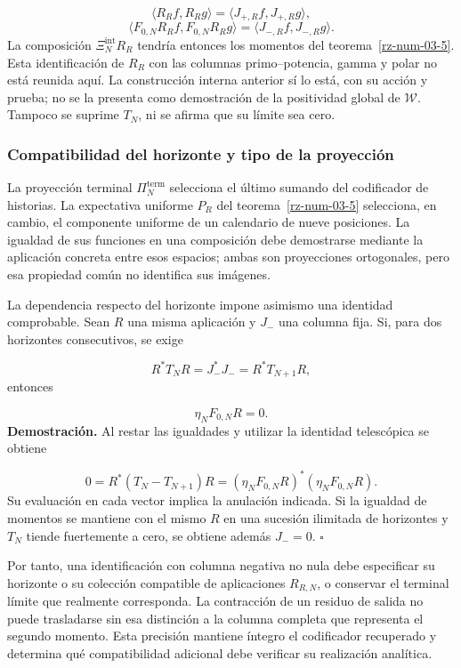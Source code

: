 \[
\langle R_Rf,R_Rg\rangle
=\langle J_{+,R}f,J_{+,R}g\rangle,
\]
\[
\langle F_{0,N}R_Rf,F_{0,N}R_Rg\rangle
=\langle J_{-,R}f,J_{-,R}g\rangle.
\]
La composición \(\Xi_N^{\mathrm{int}}R_R\) tendría entonces los momentos del teorema~\ref{rz-num-03-5}. Esta identificación de \(R_R\) con las columnas primo–potencia, gamma y polar no está reunida aquí. La construcción interna anterior sí lo está, con su acción y prueba; no se la presenta como demostración de la positividad global de \(\mathscr W\). Tampoco se suprime \(T_N\), ni se afirma que su límite sea cero.

\subsubsection*{Compatibilidad del horizonte y tipo de la proyección}
La proyección terminal \(\Pi_N^{\mathrm{term}}\) selecciona el último sumando del codificador de historias. La expectativa uniforme \(P_R\) del teorema~\ref{rz-num-03-5} selecciona, en cambio, el componente uniforme de un calendario de nueve posiciones. La igualdad de sus funciones en una composición debe demostrarse mediante la aplicación concreta entre esos espacios; ambas son proyecciones ortogonales, pero esa propiedad común no identifica sus imágenes.

La dependencia respecto del horizonte impone asimismo una identidad comprobable. Sean \(R\) una misma aplicación y \(J_-\) una columna fija. Si, para dos horizontes consecutivos, se exige

\[
R^*T_NR=J_-^*J_-=R^*T_{N+1}R,
\]
entonces

\[
\eta_NF_{0,N}R=0.
\]
\textbf{Demostración.} Al restar las igualdades y utilizar la identidad telescópica se obtiene

\[
0=R^*(T_N-T_{N+1})R
=(\eta_NF_{0,N}R)^*(\eta_NF_{0,N}R).
\]
Su evaluación en cada vector implica la anulación indicada. Si la igualdad de momentos se mantiene con el mismo \(R\) en una sucesión ilimitada de horizontes y \(T_N\) tiende fuertemente a cero, se obtiene además \(J_-=0\). \hfill\(\square\)

Por tanto, una identificación con columna negativa no nula debe especificar su horizonte o su colección compatible de aplicaciones \(R_{R,N}\), o conservar el terminal límite que realmente corresponda. La contracción de un residuo de salida no puede trasladarse sin esa distinción a la columna completa que representa el segundo momento. Esta precisión mantiene íntegro el codificador recuperado y determina qué compatibilidad adicional debe verificar su realización analítica.

